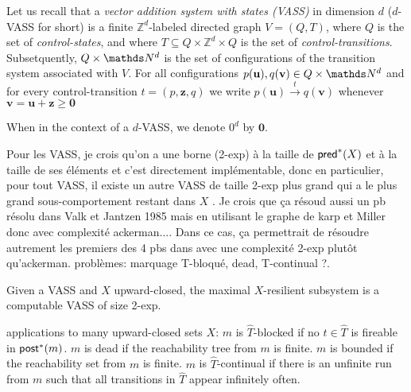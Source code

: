 
Let us recall that a {\em vector addition system with states (VASS)} in dimension $d$ ($d$-VASS for short) is a finite $\mathds{Z}^d$-labeled directed graph $V = (Q,T)$, where $Q$ is the set of {\em control-states}, and where $T \subseteq Q \times \mathds{Z}^d \times Q$ is the set of {\em control-transitions}. 
%
Subsetquently, $Q \times \N^d$ is the set of configurations of the transition system associated with $V$.
For all configurations $p(\textbf{u}), q(\textbf{v}) \in Q \times \N^d$ and for every control-transition $t = (p, \textbf{z}, q)$ we write $p(\textbf{u}) \xrightarrow{t} q(\textbf{v})$ whenever $\textbf{v} = \textbf{u} + \textbf{z} \geq \textbf{0}$
%
\iffalse \mathieu{Defining it like this makes it a LTS rather than a unlabeled TS - maybe talk about how we can 'forget' the labels to obtain an unlabeled TS ?}
\alain{les VASS ne sont pas vraiment étiquetés, sauf si on veut le faire, car on peut dire que les VASS sont définis à partir d'un nombre fini de control-transitions  $t = (p, \textbf{z}, q)$ générant une infinité de transtions notées $p(\textbf{u}) \xrightarrow{t} q(\textbf{v})$ puisque pour tout s, $p(\textbf{u+s}) \xrightarrow{t} q(\textbf{v+s})$} \fi
When in the context of a $d$-VASS, we denote $0^d$ by $\textbf{0}$.


Pour les VASS, je crois qu'on a une borne (2-exp) à la taille de $\textsf{pred}^*(X)$ et à la taille de ses éléments \cite{DBLP:conf/rp/BozzelliG11} et c'est directement implémentable, donc en particulier, pour tout VASS, il existe un autre VASS de taille 2-exp plus grand qui a le plus grand sous-comportement restant dans $X$ .
Je crois que ça résoud aussi un pb résolu dans Valk et Jantzen 1985 \cite{DBLP:journals/acta/ValkJ85} mais en utilisant le graphe de karp et Miller donc avec complexité ackerman.... Dans ce cas, ça permettrait de résoudre autrement les premiers des 4 pbs dans \cite{DBLP:journals/acta/ValkJ85} avec une complexité 2-exp plutôt qu'ackerman. problèmes: marquage T-bloqué, dead, T-continual ?.

\begin{theorem}{}
Given a VASS and $X$ upward-closed, the maximal $X$-resilient subsystem is a computable VASS of size 2-exp.
\end{theorem}

applications to many upward-closed sets $X$:
$m$ is $\hat{T}$-blocked if no $t \in \hat{T}$ is fireable in $\textsf{post}^*(m)$.
$m$ is dead if the reachability tree from $m$ is finite.
$m$ is bounded if the reachability set from $m$ is finite.
$m$ is $\hat{T}$-continual if there is an unfinite run from $m$ such that all transitions in $\hat{T}$ appear infinitely often.


